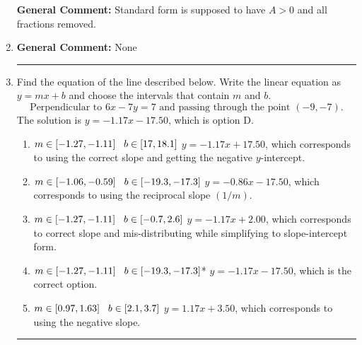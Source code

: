 \documentclass{extbook}[14pt]
\newcommand{\litem}[1]{\item#1\hspace*{-1cm}\rule{\textwidth}{0.4pt}}
\begin{document}
\begin{enumerate}
{\textbf{General Comment:} Standard form is supposed to have $A > 0$ and all fractions removed.
}
\litem{



\textbf{General Comment:} None
}
\litem{
Find the equation of the line described below. Write the linear equation as $ y=mx+b $ and choose the intervals that contain $m$ and $b$.
\[ \text{Perpendicular to } 6 x - 7 y = 7 \text{ and passing through the point } (-9, -7). \]
The solution is \( y = -1.17x - 17.50 \), which is option D.\begin{enumerate}[label=\Alph*.]
\item \( m \in [-1.27, -1.11] \hspace*{3mm} b \in [17, 18.1] \) $y = -1.17x + 17.50$, which corresponds to using the correct slope and getting the negative $y$-intercept.
\item \( m \in [-1.06, -0.59] \hspace*{3mm} b \in [-19.3, -17.3] \) $y = -0.86x - 17.50$, which corresponds to using the reciprocal slope $(1/m)$.
\item \( m \in [-1.27, -1.11] \hspace*{3mm} b \in [-0.7, 2.6] \) $y = -1.17x + 2.00$, which corresponds to correct slope and mis-distributing while simplifying to slope-intercept form.
\item \( m \in [-1.27, -1.11] \hspace*{3mm} b \in [-19.3, -17.3] \)* $y = -1.17x - 17.50$, which is the correct option.
\item \( m \in [0.97, 1.63] \hspace*{3mm} b \in [2.1, 3.7] \) $y = 1.17x + 3.50$, which corresponds to using the negative slope.
\end{enumerate}

}
\end{enumerate}
\end{document}
